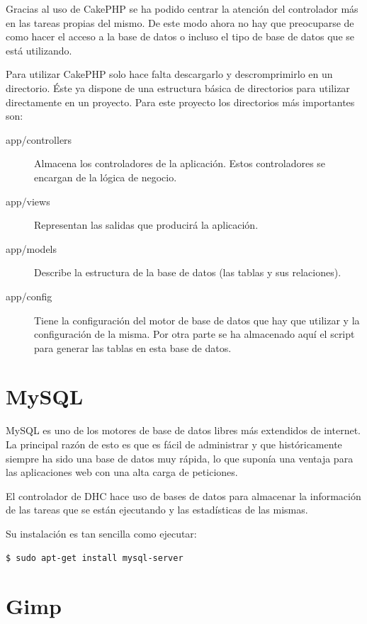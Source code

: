 Gracias al uso de CakePHP se ha podido centrar la atención del controlador más en las tareas propias del mismo. De este modo ahora no hay que preocuparse de como hacer el acceso a la base de datos o incluso el tipo de base de datos que se está utilizando.

Para utilizar CakePHP solo hace falta descargarlo y descromprimirlo en un directorio. Éste ya dispone de una estructura básica de directorios para utilizar directamente en un proyecto. Para este proyecto los directorios más importantes son:

\begin{description}
	\item[app/controllers] Almacena los controladores de la aplicación. Estos controladores se encargan de la lógica de negocio.
	
	\item[app/views] Representan las salidas que producirá la aplicación.
	
	\item[app/models] Describe la estructura de la base de datos (las tablas y sus relaciones).

	\item[app/config] Tiene la configuración del motor de base de datos que hay que utilizar y la configuración de la misma. Por otra parte se ha almacenado aquí el script para generar las tablas en esta base de datos.
\end{description}

\section{MySQL}

MySQL es uno de los motores de base de datos libres más extendidos de internet. La principal razón de esto es que es fácil de administrar y que históricamente siempre ha sido una base de datos muy rápida, lo que suponía una ventaja para las aplicaciones web con una alta carga de peticiones.

El controlador de DHC hace uso de bases de datos para almacenar la información de las tareas que se están ejecutando y las estadísticas de las mismas.

Su instalación es tan sencilla como ejecutar:

\begin{verbatim}
$ sudo apt-get install mysql-server
\end{verbatim}

\section{Gimp}

